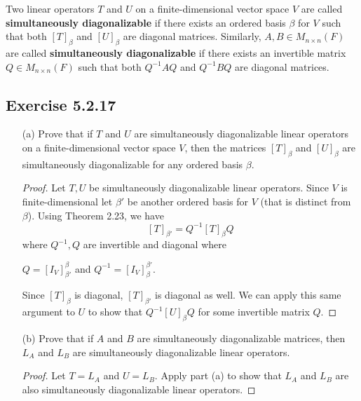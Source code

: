 \begin{definition}
    Two linear operators \( T  \) and \( U  \) on a finite-dimensional vector space \( V  \) are called \textbf{simultaneously diagonalizable} if there exists an ordered basis \( \beta \) for \( V  \) such that both \( [T]_{\beta} \) and \( [U]_{\beta} \) are diagonal matrices. Similarly, \( A,B \in {M}_{n \times n}(F) \) are called \textbf{simultaneously diagonalizable} if there exists an invertible matrix \( Q \in {M}_{n \times n}(F) \) such that both \( Q^{-1} A Q  \) and \( Q^{-1} B Q   \) are diagonal matrices.
\end{definition} 

\subsection*{Exercise 5.2.17} 
\begin{enumerate}
    \item[(a)] Prove that if \( T  \) and \( U  \) are simultaneously diagonalizable linear operators on a finite-dimensional vector space \( V  \), then the matrices \( [T]_{\beta} \) and \( [U]_{\beta} \) are simultaneously diagonalizable for any ordered basis \( \beta \).
        \begin{proof}
        Let \( T, U  \) be simultaneously diagonalizable linear operators. Since \( V  \) is finite-dimensional let \( \beta'  \) be another ordered basis for \( V  \) (that is distinct from \( \beta \)). Using Theorem 2.23, we have
        \[  [T]_{\beta'} = Q^{-1} [T]_{\beta} Q \]
        where \( Q^{-1}, Q  \) are invertible and diagonal where 
        \begin{center}
            \( Q = [{I}_{V}]_{\beta'}^{\beta}  \) and \( Q^{-1} = [{I}_{V}]_{\beta}^{\beta'}  \).
        \end{center}
        Since \( [T]_{\beta} \) is diagonal, \( [T]_{\beta'}  \) is diagonal as well. We can apply this same argument to \( U  \) to show that \( Q^{-1} [U]_{\beta} Q   \) for some invertible matrix \( Q \).
        \end{proof}
    \item[(b)] Prove that if \( A  \) and \( B  \) are simultaneously diagonalizable matrices, then \( {L}_{A} \) and \( {L}_{B} \) are simultaneously diagonalizable linear operators.
        \begin{proof}
        Let \( T = {L}_{A} \) and \( U = {L}_{B} \). Apply part (a) to show that \( {L}_{A} \) and \( {L}_{B} \) are also simultaneously diagonalizable linear operators. 
        \end{proof}
\end{enumerate}

